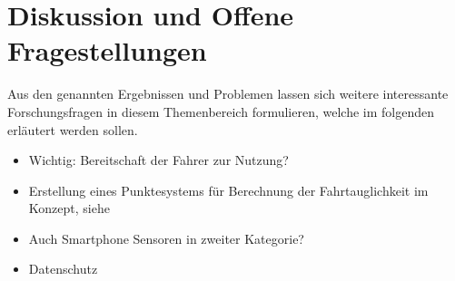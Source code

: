 \section{Diskussion und Offene Fragestellungen}
\label{openChallenges}
Aus den genannten Ergebnissen und Problemen lassen sich weitere interessante Forschungsfragen in diesem Themenbereich formulieren, welche im folgenden erläutert werden sollen.

\begin{itemize}
	\item Wichtig: Bereitschaft der Fahrer zur Nutzung?
	\item Erstellung eines Punktesystems für Berechnung der Fahrtauglichkeit im Konzept, siehe \cite{drivesafe}
	\item Auch Smartphone Sensoren in zweiter Kategorie? \cite{monitoringstressheartrate, bewegungserkennungsensoren}
	\item Datenschutz \cite{beurteilungskriterienleipzig, securityprivacyfitnesstracking}
\end{itemize}
